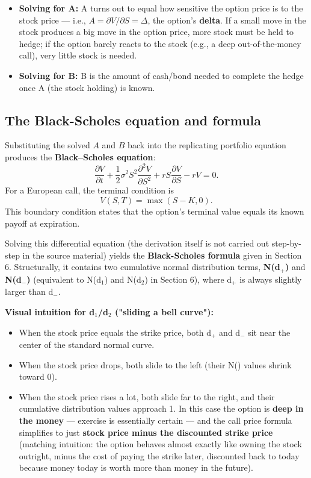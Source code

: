 \documentclass[12pt,openany]{book}
\theoremstyle{definition}
\theoremstyle{remark}
\begin{document}
\begin{itemize}
\item \textbf{Solving for A:} A turns out to equal how sensitive the option price is to the stock price --- i.e., \(A=\partial V/\partial S=\Delta\), the option's \textbf{delta}. If a small move in the stock produces a big move in the option price, more stock must be held to hedge; if the option barely reacts to the stock (e.g., a deep out-of-the-money call), very little stock is needed.


\item \textbf{Solving for B:} B is the amount of cash/bond needed to complete the hedge once A (the stock holding) is known.


\end{itemize}

\subsection{The Black-Scholes equation and formula}

Substituting the solved \(A\) and \(B\) back into the replicating portfolio
equation produces the \textbf{Black--Scholes equation}:
\[
\boxed{
\frac{\partial V}{\partial t}
+\frac12\sigma^2S^2\frac{\partial^2V}{\partial S^2}
+rS\frac{\partial V}{\partial S}-rV=0.
}
\]
For a European call, the terminal condition is
\[
V(S,T)=\max(S-K,0).
\]
This boundary condition states that the option's terminal value equals its
known payoff at expiration.

Solving this differential equation (the derivation itself is not carried out step-by-step in the source material) yields the \textbf{Black-Scholes formula} given in Section 6. Structurally, it contains two cumulative normal distribution terms, \textbf{N(d\(_+\))} and \textbf{N(d\(_-\))} (equivalent to N(d\(_1\)) and N(d\(_2\)) in Section 6), where d\(_+\) is always slightly larger than d\(_-\).

\textbf{Visual intuition for d\(_1\)/d\(_2\) ("sliding a bell curve"):}

\begin{itemize}
\item When the stock price equals the strike price, both d\(_+\) and d\(_-\) sit near the center of the standard normal curve.


\item When the stock price drops, both slide to the left (their N() values shrink toward 0).


\item When the stock price rises a lot, both slide far to the right, and their cumulative distribution values approach 1. In this case the option is \textbf{deep in the money} --- exercise is essentially certain --- and the call price formula simplifies to just \textbf{stock price minus the discounted strike price} (matching intuition: the option behaves almost exactly like owning the stock outright, minus the cost of paying the strike later, discounted back to today because money today is worth more than money in the future).


\end{itemize}
\end{document}
